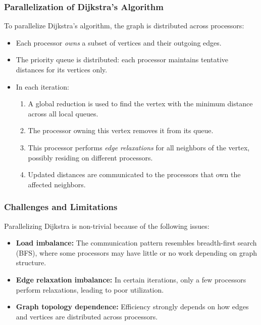 \documentclass[12pt]{book}
\begin{document}
\subsubsection*{Parallelization of Dijkstra's Algorithm}
To parallelize Dijkstra’s algorithm, the graph is distributed across processors:
\begin{itemize}
    \item Each processor \emph{owns} a subset of vertices and their outgoing edges.
    \item The priority queue is distributed: each processor maintains tentative distances for its vertices only.
    \item In each iteration:
    \begin{enumerate}
        \item A global reduction is used to find the vertex with the minimum distance across all local queues.
        \item The processor owning this vertex removes it from its queue.
        \item This processor performs \emph{edge relaxations} for all neighbors of the vertex, possibly residing on different processors.
        \item Updated distances are communicated to the processors that own the affected neighbors.
    \end{enumerate}
\end{itemize}

\subsubsection*{Challenges and Limitations}
Parallelizing Dijkstra is non-trivial because of the following issues:
\begin{itemize}
    \item \textbf{Load imbalance:} The communication pattern resembles breadth-first search (BFS), where some processors may have little or no work depending on graph structure.
    \item \textbf{Edge relaxation imbalance:} In certain iterations, only a few processors perform relaxations, leading to poor utilization.
    \item \textbf{Graph topology dependence:} Efficiency strongly depends on how edges and vertices are distributed across processors.
\end{itemize}
\end{document}
